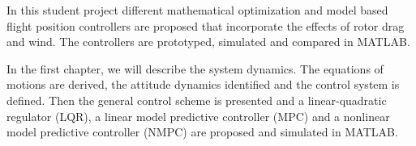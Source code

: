In this student project different mathematical optimization and model based flight position controllers are proposed that incorporate the effects of rotor drag and wind. The controllers are prototyped, simulated and compared in MATLAB.

In the first chapter, we will describe the system dynamics. The equations of motions are derived, the attitude dynamics identified and the control system is defined. Then the general control scheme is presented and a linear-quadratic regulator (LQR), a linear model predictive controller (MPC) and a nonlinear model predictive controller (NMPC) are proposed and simulated in MATLAB. 